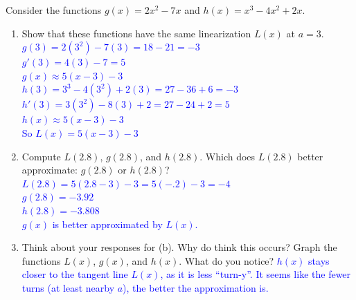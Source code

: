 \documentclass{ximera}
\begin{document}
\begin{exercise}
   Consider the functions $g(x)=2x^{2}-7x$ and $h(x)=x^{3}-4x^{2}+2x$. 
   \begin{enumerate}
       \item Show that these functions have the same linearization $L(x)$ at $a=3$.
        \textcolor{blue}{ $g(3)=2(3^2)-7(3)=18-21=-3$\\
        $g'(3)=4(3)-7=5$\\
        $g(x)\approx 5(x-3)-3$\\
        $h(3)=3^3-4(3^2)+2(3)=27-36+6=-3$\\
        $h'(3)=3(3^2)-8(3)+2=27-24+2=5$\\
        $h(x)\approx 5(x-3)-3$\\
        So $L(x)=5(x-3)-3$}
    
        
        \item Compute $L(2.8)$, $g(2.8)$, and $h(2.8)$. Which does $L(2.8)$ better approximate: $g(2.8)$ or $h(2.8)$? \\
        \textcolor{blue}{ $L(2.8)=5(2.8-3)-3=5(-.2)-3=-4$\\
        $g(2.8)=-3.92$\\
        $h(2.8)=-3.808$\\
        $g(x)$ is better approximated by $L(x)$.}
        
        \item Think about your responses for (b). Why do think this occurs? Graph the functions $L(x)$, $g(x)$, and $h(x)$. What do you notice?
        \textcolor{blue}{ $h(x)$ stays closer to the tangent line $L(x)$, as it is less ``turn-y''.  It seems like the fewer turns (at least nearby $a$), the better the approximation is.}\\
    
   \end{enumerate}
\end{exercise}
\end{document}

